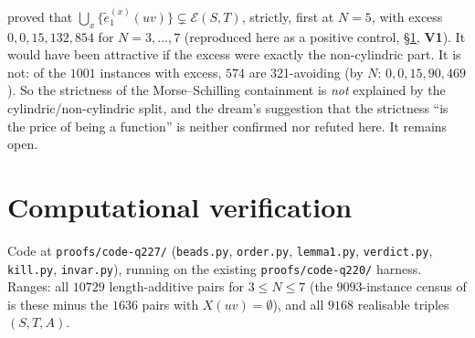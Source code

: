 \documentclass[11pt]{article}
\theoremstyle{plain}
\theoremstyle{definition}
\begin{document}
\cite{ClioCrystal} proved that $\bigcup_{x}\{\tilde e_1^{(x)}(uv)\}\subsetneq\mathcal{E}(S,T)$,
strictly, first at $N=5$, with excess $0,0,15,132,854$ for $N=3,\dots,7$ (reproduced here as a
positive control, \S\ref{sec:verify}, \textbf{V1}). It would have been attractive if the excess
were exactly the non-cylindric part. It is not: of the $1001$ instances with excess,
$574$ are 321-avoiding (by $N$: $0,0,15,90,469$). So the strictness of the Morse--Schilling
containment is \emph{not} explained by the cylindric/non-cylindric split, and the dream's
suggestion that the strictness ``is the price of being a function'' is neither confirmed nor
refuted here. It remains open.

\section{Computational verification}\label{sec:verify}

Code at \texttt{proofs/code-q227/} (\texttt{beads.py}, \texttt{order.py}, \texttt{lemma1.py},
\texttt{verdict.py}, \texttt{kill.py}, \texttt{invar.py}), running on the existing
\texttt{proofs/code-q220/} harness. Ranges: all $10729$ length-additive pairs for
$3\le N\le7$ (the $9093$-instance census of \cite{ClioCrystal} is these minus the $1636$ pairs
with $X(uv)=\emptyset$), and all $9168$ realisable triples $(S,T,A)$.
\end{document}
